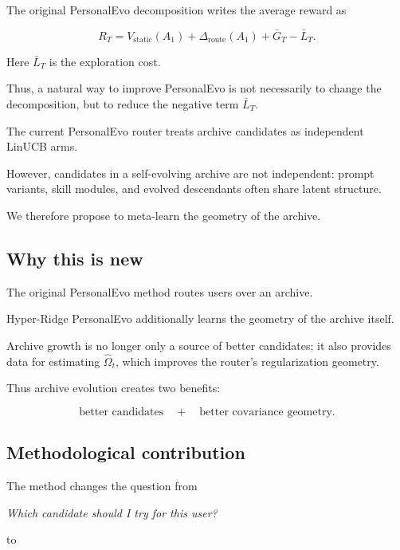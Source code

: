 \documentclass{article} %
\providecommand{\Rstatic}{V_{\mathrm{static}}}
\providecommand{\Droute}{\Delta_{\mathrm{route}}}
\begin{document}
The original PersonalEvo decomposition writes the average reward as

\[
R_T = \Rstatic(A_1) + \Droute(A_1) + \bar{G}_T - \bar{L}_T .
\]

Here $\bar{L}_T$ is the exploration cost.

Thus, a natural way to improve
PersonalEvo is not necessarily to change the decomposition, but to reduce the
negative term $\bar{L}_T$.

The current PersonalEvo router treats archive candidates as independent LinUCB
arms.

However, candidates in a self-evolving archive are not independent:
prompt variants, skill modules, and evolved descendants often share latent
structure.

We therefore propose to meta-learn the geometry of the archive.

\begin{center}
\end{center}

\subsection{Why this is new}

The original PersonalEvo method routes users over an archive.

Hyper-Ridge
PersonalEvo additionally learns the geometry of the archive itself.

Archive
growth is no longer only a source of better candidates; it also provides data
for estimating $\widehat{\Omega}_t$, which improves the router's
regularization geometry.

Thus archive evolution creates two benefits:

\[
\text{better candidates} \quad + \quad \text{better covariance geometry}.
\]



\subsection{Methodological contribution}

The method changes the question from

\begin{center}
\emph{Which candidate should I try for this user?}
\end{center}

to
\end{document}
